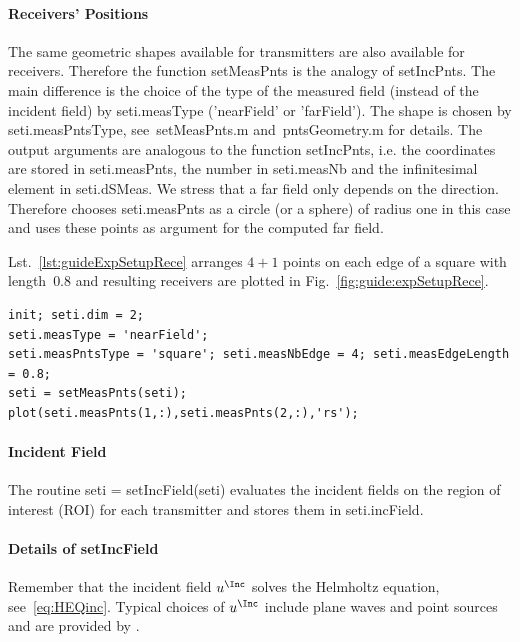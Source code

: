 \documentclass[a4paper]{article}
\begin{document}
\paragraph{Receivers' Positions} The same geometric shapes available for transmitters are also available for receivers. Therefore the function \textsf{setMeasPnts} is the analogy of \textsf{setIncPnts}. 
%
The main difference is the choice of the type of the measured field (instead of the incident field) by \textsf{seti.measType} (\textsf{'nearField'} or \textsf{'farField'}). The shape is chosen by \textsf{seti.measPntsType}, see~\textsf{setMeasPnts.m} and~\textsf{pntsGeometry.m} for details.
%
The output arguments are analogous to the function \textsf{setIncPnts}, i.e. the coordinates are stored in \textsf{seti.measPnts}, the number in \textsf{seti.measNb} and the infinitesimal element in \textsf{seti.dSMeas}.
%
We stress that a far field only depends on the direction. Therefore \IPscatt chooses \textsf{seti.measPnts} as a circle (or a sphere) of radius one in this case and uses these points as argument for the computed far field.

Lst.~\ref{lst:guideExpSetupRece} arranges $4+1$ points on each edge of a square with length~$0.8$ and resulting receivers are plotted in Fig.~\ref{fig:guide:expSetupRece}.

\begin{lstlisting}[caption={Arrange receivers on a square (\emph{source code}: \textsf{guides/guideExpSetupRece.m}).},label=lst:guideExpSetupRece]
init; seti.dim = 2;
seti.measType = 'nearField';
seti.measPntsType = 'square'; seti.measNbEdge = 4; seti.measEdgeLength = 0.8;
seti = setMeasPnts(seti);
plot(seti.measPnts(1,:),seti.measPnts(2,:),'rs');
\end{lstlisting}

\paragraph{Incident Field} The routine \textsf{seti = setIncField(seti)} evaluates the incident fields on the region of interest (ROI) for each transmitter and stores them in \textsf{seti.incField}.

\paragraph{Details of \textsf{setIncField}} Remember that the incident field $u^\Inc$ solves the Helm\-holtz equation, see~\eqref{eq:HEQinc}. Typical choices of $u^\Inc$ include plane waves and point sources and are provided by \IPscatt. 
\end{document}
